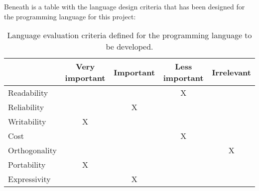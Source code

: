 Beneath is a table with the language design criteria that has been designed for the programming language for this project:
\begin{table}[htbp]
\centering
\begin{tabular}{|l|c|c|c|c|}
\hline
& Very important & Important & Less important & Irrelevant \\ \hline
Readability & & & X & \\ \hline
Reliability & & X & & \\ \hline
Writability & X & & & \\ \hline
Cost & & & X & \\ \hline
Orthogonality & & & & X \\ \hline
Portability & X & & & \\ \hline
Expressivity & & X & & \\ \hline
\end{tabular}
\caption{Language evaluation criteria defined for the programming language to be developed.}
\label{tbl:evaluation criteria}
\end{table}